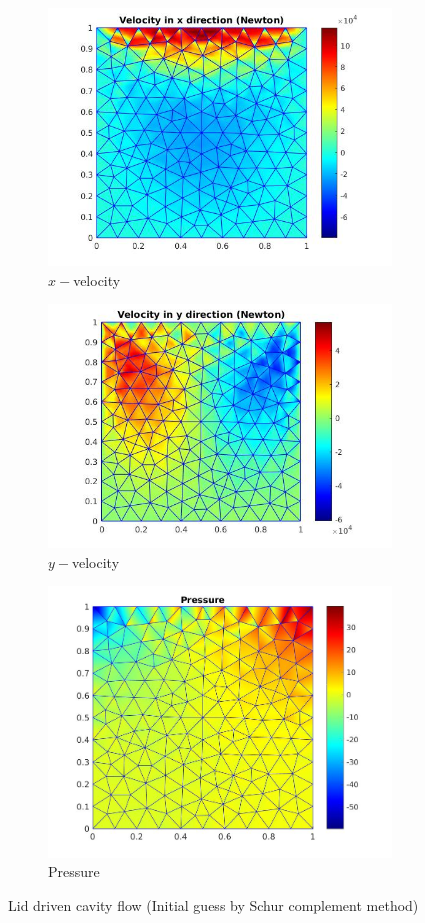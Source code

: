 \documentclass[a4paper,twoside,openright]{book}
\begin{document}
\begin{figure}
  \begin{subfigure}{\textwidth}
    \includegraphics[width=0.8\linewidth]{lid_newton_vx_schur.jpg}
    \caption{$x-$velocity}
  \label{x_vel_navier_stoke_schur_lid}
  \end{subfigure}
  \begin{subfigure}{\textwidth}
    \includegraphics[width=0.8\linewidth]{lid_newton_vy_schur.jpg}
    \caption{$y-$velocity}
  \label{y_vel_navier_stoke_schur_lid}
  \end{subfigure}
  \begin{subfigure}{\textwidth}
    \includegraphics[width=0.8\linewidth]{lid_newton_pressure_schur.jpg}
    \caption{Pressure}
  \label{pressure_navier_stoke_schur_lid}
  \end{subfigure}
\caption{Lid driven cavity flow (Initial guess by Schur complement method)}
\label{lid_driven_cavity_n_s_schur}
\end{figure}
\end{document}
